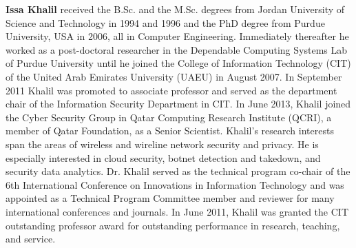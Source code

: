 \documentclass[10pt,journal]{IEEEtran}
\begin{document}
\textbf{Issa Khalil} received the B.Sc. and the M.Sc. degrees from Jordan University of Science and Technology in 1994 and 1996 and the PhD degree from Purdue University, USA in 2006, all in Computer Engineering. Immediately thereafter he worked as a post-doctoral researcher in the Dependable Computing Systems Lab of Purdue University until he joined the College of Information Technology (CIT) of the United Arab Emirates University (UAEU) in August 2007. In September 2011 Khalil was promoted to associate professor and served as the department chair of the Information Security Department in CIT. In June 2013, Khalil joined the Cyber Security Group in Qatar Computing Research Institute (QCRI), a member of Qatar Foundation, as a Senior Scientist. Khalil’s research interests span the areas of wireless and wireline network security and privacy. He is especially interested in cloud security, botnet detection and takedown, and security data analytics. Dr. Khalil served as the technical program co-chair of the 6th International Conference on Innovations in Information Technology and was appointed as a Technical Program Committee member and reviewer for many international conferences and journals. In June 2011, Khalil was granted the CIT outstanding professor award for outstanding performance in research, teaching, and service.
\end{document}
